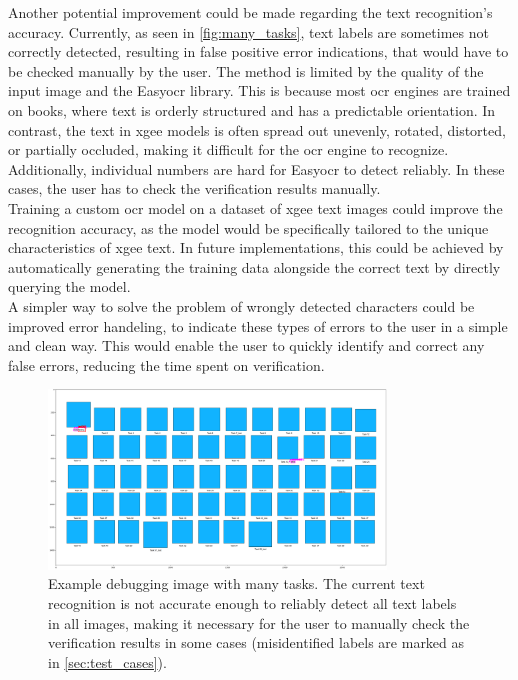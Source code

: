 Another potential improvement could be made regarding the text recognition's accuracy. Currently, as seen in \autoref{fig:many_tasks}, text labels are sometimes not correctly detected, resulting in false positive error indications, that would have to be checked manually by the user. The method is limited by the quality of the input image and the Easy\acrshort{ocr} library. This is because most \acrshort{ocr} engines are trained on books, where text is orderly structured and has a predictable orientation. In contrast, the text in \acrshort{xgee} models is often spread out unevenly, rotated, distorted, or partially occluded, making it difficult for the \acrshort{ocr} engine to recognize. Additionally, individual numbers are hard for Easy\acrshort{ocr} to detect reliably. In these cases, the user has to check the verification results manually.\\
Training a custom \acrshort{ocr} model on a dataset of \acrshort{xgee} text images could improve the recognition accuracy, as the model would be specifically tailored to the unique characteristics of \acrshort{xgee} text. In future implementations, this could be achieved by automatically generating the training data alongside the correct text by directly querying the model.\\
A simpler way to solve the problem of wrongly detected characters could be improved error handeling, to indicate these types of errors to the user in a simple and clean way. This would enable the user to quickly identify and correct any false errors, reducing the time spent on verification.
\begin{figure}
    \centering
    \includegraphics[width=0.8\textwidth]{pictures/many_tasks.png}
    \caption[Example of a model with many tasks]{Example debugging image with many tasks. The current text recognition is not accurate enough to reliably detect all text labels in all images, making it necessary for the user to manually check the verification results in some cases (misidentified labels are marked as in \autoref{sec:test_cases}).}
    \label{fig:many_tasks}
\end{figure}

